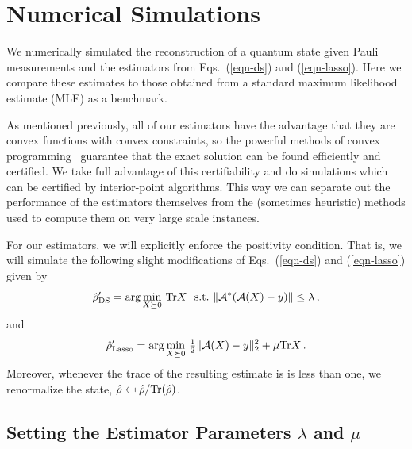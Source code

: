 
\section{Numerical Simulations\label{S:numerics}}


We numerically simulated the reconstruction of a quantum state given Pauli measurements and the estimators from Eqs.~(\ref{eqn-ds}) and (\ref{eqn-lasso}). Here we compare these estimates to those obtained from a standard maximum likelihood estimate (MLE) as a benchmark. 

As mentioned previously, all of our estimators have the advantage that they are convex functions with convex constraints, so the powerful methods of convex programming~\cite{Boyd2004} guarantee that the exact solution can be found efficiently and certified. We take full advantage of this certifiability and do simulations which can be certified by interior-point algorithms. This way we can separate out the performance of the estimators themselves from the (sometimes heuristic) methods used to compute them on very large scale instances. 

For our estimators, we will explicitly enforce the positivity condition. That is, we will simulate the following slight modifications of Eqs.~(\ref{eqn-ds}) and (\ref{eqn-lasso}) given by
\begin{equation}\label{E:new-ds}
	\hat{\rho}_{\mathrm{DS}}' = \arg\min_{X\succeq0}\, \mathrm{Tr} X \ \ \mbox{s.t.} \  \lVert\mathcal{A}^*(\mathcal{A}(X)-y)\rVert \leq \lambda\,,
\end{equation}
and
\begin{equation}\label{E:new-lasso}
	\hat{\rho}_{\mathrm{Lasso}}' = \arg\min_{X\succeq0}\, \tfrac{1}{2} \lVert\mathcal{A}(X)-y\rVert_2^2 + \mu \mathrm{Tr} X \,.
\end{equation}
Moreover, whenever the trace of the resulting estimate is is less than one, we renormalize the state, $\hat\rho \mapsfrom \hat\rho/\mathrm{Tr}(\hat\rho)$. 

\subsection{Setting the Estimator Parameters \texorpdfstring{$\lambda$}{lambda} and \texorpdfstring{$\mu$}{mu}}


